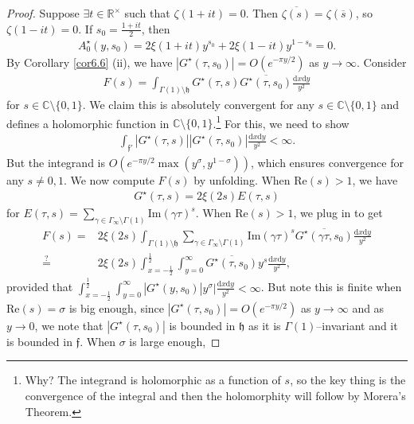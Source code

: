 \documentclass{article}
\theoremstyle{definition}
\begin{document}
\begin{proof}
    Suppose $\exists t \in \mathbb{R}^\times$ such that $\zeta(1+it) = 0$. Then $\overline{\zeta(s)} = \zeta(\overline{s})$, so $\zeta(1-it) = 0$. If $s_0 = \frac{1+it}{2}$, then 
    \begin{align*}
        A_0^{\star}(y,s_0) = 2\xi(1+it)y^{s_0} + 2\xi(1-it)y^{1-s_0} = 0.
    \end{align*}
    By Corollary \ref{cor6.6} (ii), we have $|G^\star(\tau,s_0)| = O(e^{-\pi y/2})$ as $y \to \infty$. Consider
    \begin{align*}
        F(s) = \int_{\Gamma(1)\setminus \mathfrak{h}}^{} G^\star(\tau,s)\overline{G^\star(\tau,s_0)} \frac{\mathrm{d}x\mathrm{d}y}{y^2}
    \end{align*}
    for $s \in \mathbb{C} \setminus \{0,1\}$. We claim this is absolutely convergent for any $s \in \mathbb{C} \setminus \{0,1\}$ and defines a holomorphic function in $\mathbb{C}\setminus \{0,1\}$.\footnote{Why? The integrand is holomorphic as a function of $s$, so the key thing is the convergence of the integral and then the holomorphity will follow by Morera's Theorem.} For this, we need to show
    \begin{align*}
        \int_{\mathfrak{f'}}|G^{\star}(\tau,s)||G^{\star}(\tau,s_0)|\frac{\mathrm{d}x\mathrm{d}y}{y^2}<\infty. 
    \end{align*}
    But the integrand is $O(e^{-\pi y/2}\max(y^{\sigma},y^{1-\sigma}))$, which ensures convergence for any $s \neq 0,1$. We now compute $F(s)$ by unfolding. When $\text{Re}(s)>1$, we have
    \begin{align*}
        G^{\star}(\tau,s) = 2\xi(2s)E(\tau,s)
    \end{align*}
    for $E(\tau,s) = \sum_{\gamma \in \Gamma_{\infty}\setminus \Gamma(1)} \text{Im}(\gamma \tau)^s$. When $\text{Re}(s)>1$, we plug in to get
    \begin{align*}
        F(s) =& 2\xi(2s)\int_{\Gamma(1)\setminus \mathfrak{h}}^{} \sum_{\gamma \in \Gamma_{\infty}\setminus \Gamma(1)}^{} \text{Im}(\gamma \tau)^s \overline{G^\star(\gamma \tau, s_0)}\frac{\mathrm{d}x\mathrm{d}y}{y^2}\\
        \stackrel{?}{=} & 2\xi(2s)\int_{x=-\frac{1}{2}}^{\frac{1}{2}}\int_{y=0}^{\infty} \overline{G^{\star}(\tau,s_0)}y^s \frac{\mathrm{d}x\mathrm{d}y}{y^2}, 
    \end{align*}
    provided that $\int_{x=-\frac{1}{2}}^{\frac{1}{2}} \int_{y=0}^{\infty}|G^{\star}(y,s_0)|y^{\sigma}|\frac{\mathrm{d}x\mathrm{d}y}{y^2}<\infty$. But note this is finite when $\text{Re}(s) = \sigma$ is big enough, since $|G^\star(\tau,s_0)| = O(e^{-\pi y/2})$ as $y \to \infty$ and as $y \to 0$, we note that $|G^{\star}(\tau,s_0)|$ is bounded in $\mathfrak{h}$ as it is $\Gamma(1)$--invariant and it is bounded in $\mathfrak{f}$. When $\sigma$ is large enough,

\end{proof}
\end{document}
